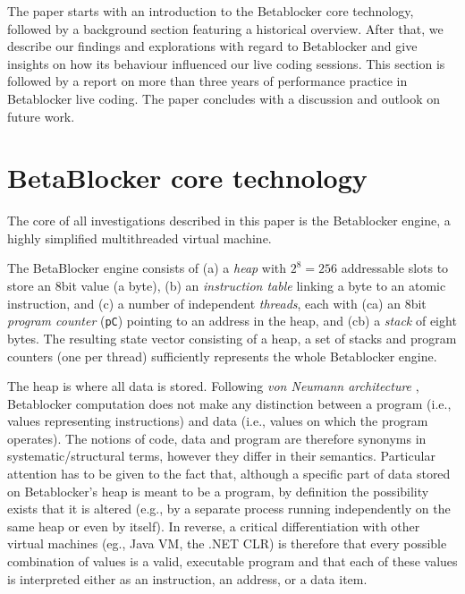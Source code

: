 \documentclass[letterpaper, 12pt]{article}
\begin{document}
The paper starts with an introduction to the Betablocker core technology, followed by a background section featuring a historical overview.
After that, we describe our findings and explorations with regard to Betablocker and give insights on how its behaviour influenced our live coding sessions.
This section is followed by a report on more than three years of performance practice in Betablocker live coding.
The paper concludes with a discussion and outlook on future work.

\section{BetaBlocker core technology}
\label{sec:betablocker_core}


The core of all investigations described in this paper is the Betablocker engine, a highly simplified multithreaded virtual machine.

The BetaBlocker engine consists of
(a) a \emph{heap} with  $2^8 = 256$ addressable slots to store an 8bit value (a byte),
(b) an \emph{instruction table} linking a byte to an atomic instruction, and
(c) a number of independent \emph{threads}, each with
	(ca) an 8bit \emph{program counter} (\texttt{pC}) pointing to an address in the heap, and (cb) a \emph{stack} of eight bytes.
The resulting state vector consisting of a heap, a set of stacks and program counters (one per thread) sufficiently represents the whole Betablocker engine.

The heap is where all data is stored.
Following \emph{von Neumann architecture} \citep*{von-neumann1993-fir}, Betablocker computation does not make any distinction between a program (i.e., values representing instructions) and data (i.e., values on which the program operates).
The notions of code, data and program are therefore synonyms in systematic/structural terms, however they differ in their semantics.
Particular attention has to be given to the fact that, although a specific part of data stored on Betablocker's heap is meant to be a program, by definition the possibility exists that it is altered (e.g., by a separate process running independently on the same heap or even by itself).
In reverse, a critical differentiation with other virtual machines (eg., Java VM, the .NET CLR) is therefore that every possible combination of values is a valid, executable program and that each of these values is interpreted either as an instruction, an address, or a data item.
\end{document}
